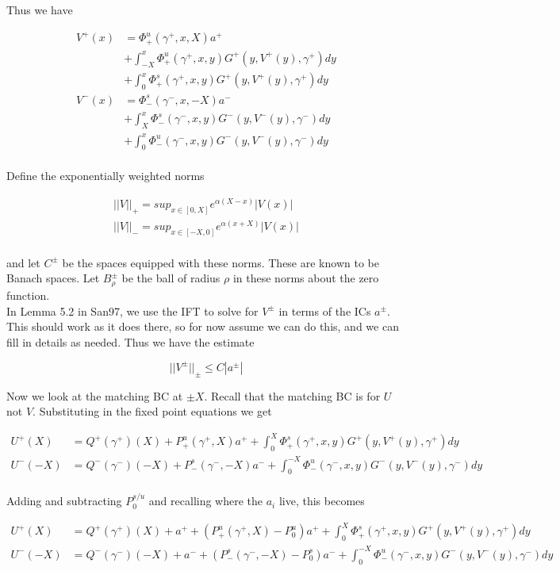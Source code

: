 \documentclass[12pt]{article}
\begin{document}
Thus we have

\begin{align*}
V^+(x) &= \Phi^u_+(\gamma^+, x, X) a^+  \\
&+ \int_{-X}^x \Phi_+^u(\gamma^+, x, y) G^+(y, V^+(y),\gamma^+)dy \\
&+ \int_0^x \Phi_+^s(\gamma^+, x, y) G^+(y, V^+(y),\gamma^+)dy \\ 
V^-(x) &= \Phi^s_-(\gamma^-, x, -X) a^-  \\
&+ \int_X^x \Phi_-^s(\gamma^-, x, y) G^-(y, V^-(y),\gamma^-)dy \\
&+ \int_0^x \Phi_-^u(\gamma^-, x, y) G^-(y, V^-(y),\gamma^-)dy \\
\end{align*}

Define the exponentially weighted norms

\begin{align*}
||V||_+ = sup_{x \in [0, X]} e^{\alpha(X - x)}|V(x)| \\
||V||_- = sup_{x \in [-X, 0]} e^{\alpha(x + X)}|V(x)| \\
\end{align*}

and let $C^\pm$ be the spaces equipped with these norms. These are known to be Banach spaces. Let $B_\rho^\pm$ be the ball of radius $\rho$ in these norms about the zero function.\\

In Lemma 5.2 in San97, we use the IFT to solve for $V^\pm$ in terms of the ICs $a^\pm$. This should work as it does there, so for now assume we can do this, and we can fill in details as needed. Thus we have the estimate

\[
||V^\pm||_\pm \leq C |a^\pm|
\]

Now we look at the matching BC at $\pm X$. Recall that the matching BC is for $U$ not $V$. Substituting in the fixed point equations we get

\begin{align*}
U^+(X) &= Q^+(\gamma^+)(X) + P^u_+(\gamma^+, X) a^+ + \int_0^X \Phi_+^s(\gamma^+, x, y) G^+(y, V^+(y),\gamma^+)dy \\ 
U^-(-X) &= Q^-(\gamma^-)(-X) + P^s_-(\gamma^-, -X) a^- + \int_0^{-X} \Phi_-^u(\gamma^-, x, y) G^-(y, V^-(y),\gamma^-)dy \\
\end{align*}

Adding and subtracting $P_0^{s/u}$ and recalling where the $a_i$ live, this becomes

\begin{align*}
U^+(X) &= Q^+(\gamma^+)(X) + a^+ + (P^u_+(\gamma^+, X) - P^u_0) a^+ + \int_0^X \Phi_+^s(\gamma^+, x, y) G^+(y, V^+(y),\gamma^+)dy \\ 
U^-(-X) &= Q^-(\gamma^-)(-X) + a^- + (P^s_-(\gamma^-, -X) - P^s_0) a^- + \int_0^{-X} \Phi_-^u(\gamma^-, x, y) G^-(y, V^-(y),\gamma^-)dy \\
\end{align*}
\end{document}
